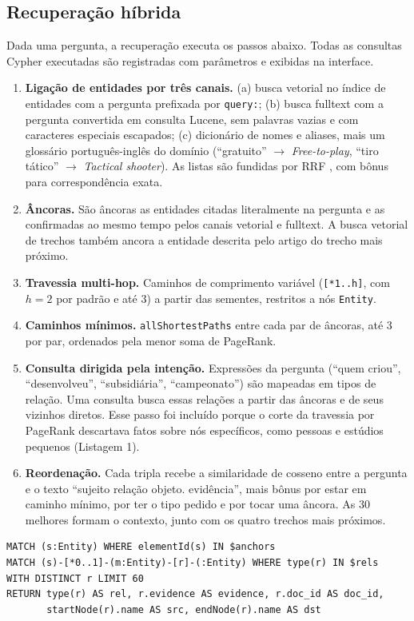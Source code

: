 \documentclass[12pt]{article}
\begin{document}
\subsection{Recuperação híbrida}
Dada uma pergunta, a recuperação executa os passos abaixo. Todas as consultas Cypher executadas são registradas com parâmetros e exibidas na interface.

\begin{enumerate}\item \textbf{Ligação de entidades por três canais.} (a) busca vetorial no índice de entidades com a pergunta prefixada por \texttt{query:}; (b) busca fulltext com a pergunta convertida em consulta Lucene, sem palavras vazias e com caracteres especiais escapados; (c) dicionário de nomes e aliases, mais um glossário português-inglês do domínio (``gratuito'' $\rightarrow$ \emph{Free-to-play}, ``tiro tático'' $\rightarrow$ \emph{Tactical shooter}). As listas são fundidas por RRF \cite{cormack2009rrf}, com bônus para correspondência exata.
\item \textbf{Âncoras.} São âncoras as entidades citadas literalmente na pergunta e as confirmadas ao mesmo tempo pelos canais vetorial e fulltext. A busca vetorial de trechos também ancora a entidade descrita pelo artigo do trecho mais próximo.
\item \textbf{Travessia multi-hop.} Caminhos de comprimento variável (\texttt{[*1..h]}, com $h = 2$ por padrão e até 3) a partir das sementes, restritos a nós \texttt{Entity}.
\item \textbf{Caminhos mínimos.} \texttt{allShortestPaths} entre cada par de âncoras, até 3 por par, ordenados pela menor soma de PageRank.
\item \textbf{Consulta dirigida pela intenção.} Expressões da pergunta (``quem criou'', ``desenvolveu'', ``subsidiária'', ``campeonato'') são mapeadas em tipos de relação. Uma consulta busca essas relações a partir das âncoras e de seus vizinhos diretos. Esse passo foi incluído porque o corte da travessia por PageRank descartava fatos sobre nós específicos, como pessoas e estúdios pequenos (Listagem 1).
\item \textbf{Reordenação.} Cada tripla recebe a similaridade de cosseno entre a pergunta e o texto ``sujeito relação objeto. evidência'', mais bônus por estar em caminho mínimo, por ter o tipo pedido e por tocar uma âncora. As 30 melhores formam o contexto, junto com os quatro trechos mais próximos.
\end{enumerate}
\begin{lstlisting}[caption={Consulta dirigida pela intenção (simplificada).}]
MATCH (s:Entity) WHERE elementId(s) IN $anchors
MATCH (s)-[*0..1]-(m:Entity)-[r]-(:Entity) WHERE type(r) IN $rels
WITH DISTINCT r LIMIT 60
RETURN type(r) AS rel, r.evidence AS evidence, r.doc_id AS doc_id,
       startNode(r).name AS src, endNode(r).name AS dst
\end{lstlisting}
\end{document}
